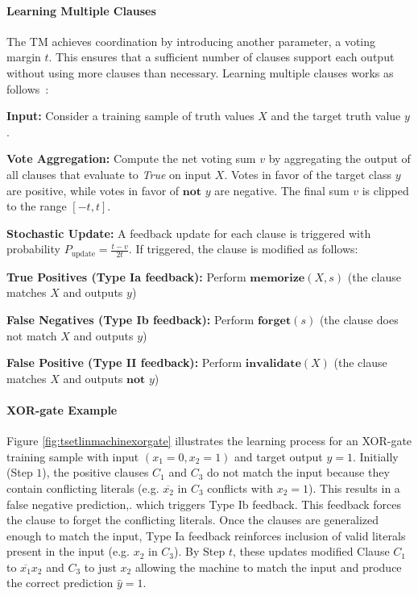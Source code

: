 \documentclass[english]{aghengthesis} %
\begin{document}
\paragraph{Learning Multiple Clauses}
The TM achieves coordination by introducing another parameter, a voting margin $t$. This ensures that a sufficient number of clauses support each output without using more clauses than necessary. Learning multiple clauses works as follows~\cite{glimsdal2021coalescedmultioutputtsetlinmachines}:
\begin{compactenum}
    \item \textbf{Input:} Consider a training sample of truth values $X$ and the target truth value $y$.
    \item \textbf{Vote Aggregation:} Compute the net voting sum $v$ by aggregating the output of all clauses that evaluate to \textit{True} on input $X$. Votes in favor of the target class $y$ are positive, while votes in favor of $\textbf{not } y$ are negative. The final sum $v$ is clipped to the range $[-t, t]$.
    \item \textbf{Stochastic Update:} A feedback update for each clause is triggered with probability $P_\text{update} = \frac{t-v}{2t}$. If triggered, the clause is modified as follows:
    \begin{compactenum}
        \item \textbf{True Positives (Type Ia feedback):} Perform $\textbf{memorize}(X,s)$ (the clause matches $X$ and outputs $y$)
        \item \textbf{False Negatives (Type Ib feedback):} Perform $\textbf{forget}(s)$ (the clause does not match $X$ and outputs $y$)
        \item \textbf{False Positive (Type II feedback):} Perform $\textbf{invalidate}(X)$ (the clause matches $X$ and outputs $\textbf{not } y$)
    \end{compactenum}
\end{compactenum}

\paragraph{XOR-gate Example}
Figure \ref{fig:tsetlinmachinexorgate} illustrates the learning process for an XOR-gate training sample with input $(x_1=0,x_2=1)$ and target output $y=1$. Initially (Step $1$), the positive clauses $C_1$ and $C_3$ do not match the input because they contain conflicting literals (e.g. $\overline{x_2}$ in $C_3$ conflicts with $x_2=1$). This results in a false negative prediction,. which triggers Type Ib feedback. This feedback forces the clause to forget the conflicting literals. Once the clauses are generalized enough to match the input, Type Ia feedback reinforces inclusion of valid literals present in the input (e.g. $x_2$ in $C_3$). By Step $t$, these updates modified Clause $C_1$ to $\overline{x_1}x_2$ and $C_3$ to just $x_2$ allowing the machine to match the input and produce the correct prediction $\hat{y}=1$.
\end{document}
